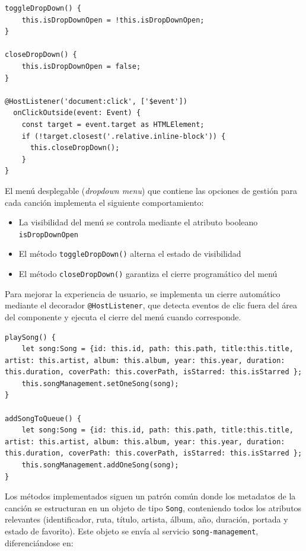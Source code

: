 \documentclass[11pt, a4paper]{article}
\begin{document}
                \begin{lstlisting}[caption={Dropdown menu}]
toggleDropDown() {
    this.isDropDownOpen = !this.isDropDownOpen;
}

closeDropDown() {
    this.isDropDownOpen = false;
}

@HostListener('document:click', ['$event'])
  onClickOutside(event: Event) {
    const target = event.target as HTMLElement;
    if (!target.closest('.relative.inline-block')) {
      this.closeDropDown();
    }
}
                \end{lstlisting}

                El menú desplegable (\textit{dropdown menu}) que contiene las opciones de gestión para cada canción implementa el siguiente comportamiento:

                \begin{itemize}
                    \item La visibilidad del menú se controla mediante el atributo booleano \verb|isDropDownOpen|
                    \item El método \verb|toggleDropDown()| alterna el estado de visibilidad
                    \item El método \verb|closeDropDown()| garantiza el cierre programático del menú
                \end{itemize}

                Para mejorar la experiencia de usuario, se implementa un cierre automático mediante el decorador \verb|@HostListener|, que detecta eventos de clic fuera del área del componente y ejecuta el cierre del menú cuando corresponde.

                \begin{lstlisting}[caption={playSong() y addSongToQueue()}]
playSong() {
    let song:Song = {id: this.id, path: this.path, title:this.title, artist: this.artist, album: this.album, year: this.year, duration: this.duration, coverPath: this.coverPath, isStarred: this.isStarred };
    this.songManagement.setOneSong(song);
}

addSongToQueue() {
    let song:Song = {id: this.id, path: this.path, title:this.title, artist: this.artist, album: this.album, year: this.year, duration: this.duration, coverPath: this.coverPath, isStarred: this.isStarred };
    this.songManagement.addOneSong(song);
}
                \end{lstlisting}

                Los métodos implementados siguen un patrón común donde los metadatos de la canción se estructuran en un objeto de tipo \verb|Song|, conteniendo todos los atributos relevantes (identificador, ruta, título, artista, álbum, año, duración, portada y estado de favorito). Este objeto se envía al servicio \verb|song-management|, diferenciándose en:
\end{document}
